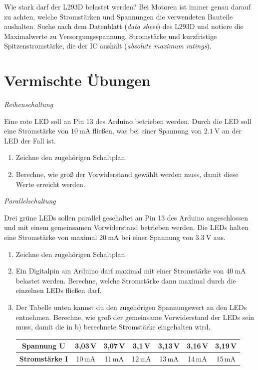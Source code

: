 \begin{recherche}{Wie stark darf der L293D belastet werden?}
	Bei Motoren ist immer genau darauf zu achten, welche Stromstärken und Spannungen die verwendeten Bauteile aushalten. Suche nach dem Datenblatt (\emph{data sheet}) des L293D und notiere die Maximalwerte zu Versorgungsspannung, Stromstärke und kurzfristige Spitzenstromstärke, die der IC aushält (\emph{absolute maximum ratings}). 
\end{recherche}


\section{Vermischte Übungen}

\begin{aufgabe} \emph{Reihenschaltung}
	
	Eine rote LED soll an Pin 13 des Arduino betrieben werden. Durch die LED soll eine Stromstärke von $\SI{10}{\milli\ampere}$ fließen, was bei einer Spannung von $\SI{2,1}{\volt}$ an der LED der Fall ist. 
	\begin{enumerate}[label=\alph*), itemsep=0ex]
		\item Zeichne den zugehörigen Schaltplan.
		\item Berechne, wie groß der Vorwiderstand gewählt werden muss, damit diese Werte erreicht werden.
	\end{enumerate}
\end{aufgabe}

\begin{aufgabe} \emph{Parallelschaltung}
	
	Drei grüne LEDs sollen parallel geschaltet an Pin 13 des Arduino angeschlossen und mit einem gemeinsamen Vorwiderstand betrieben werden. Die LEDs halten eine Stromstärke von maximal $\SI{20}{\milli\ampere}$ bei einer Spannung von $\SI{3,3}{\volt}$ aus.
	
	\begin{enumerate}[label=\alph*), itemsep=0ex]
		\item Zeichne den zugehörigen Schaltplan.
		\item Ein Digitalpin am Arduino darf maximal mit einer Stromstärke von $\SI{40}{\milli\ampere}$ belastet werden. Berechne, welche Stromstärke dann maximal durch die einzelnen LEDs fließen darf.
		\item Der Tabelle unten kannst du den zugehörigen Spannungswert an den LEDs entnehmen. Berechne, wie groß der gemeinsame Vorwiderstand der LEDs sein muss, damit die in b) berechnete Stromstärke eingehalten wird.
		
		\begin{tabular}{c | c | c | c | c | c | c}
			\hline
			\textbf{Spannung U} & 3,03\,V & 3,07\,V & 3,1\,V & 3,13\,V & 3,16\,V & 3,19\,V \\ \hline
			\textbf{Stromstärke I} & 10\,mA & 11\,mA & 12\,mA & 13\,mA & 14\,mA & 15\,mA  \\ \hline
		\end{tabular}
	\end{enumerate}
\end{aufgabe}

